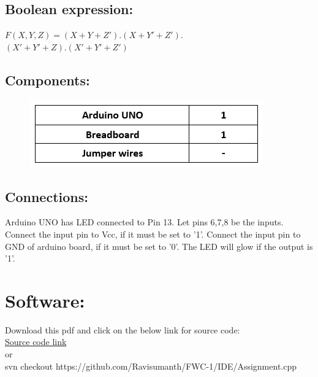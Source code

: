 \documentclass[a4paper,12pt,twocolumn]{article}
\begin{document}
\subsection{Boolean expression:}
$F(X,Y,Z)=(X+Y+Z').(X+Y'+Z').$\\$(X'+Y'+Z).(X'+Y'+Z')$

\newpage
\subsection{Components:} 
\begin{figure}[h]
\centering
\includegraphics[width=1\columnwidth]{TT-2-document}
\label{Truth Table}
\end{figure}
\subsection{Connections:}
Arduino UNO has LED connected to Pin 13. Let pins 6,7,8 be the inputs. Connect the input pin to Vcc, if it must be set to '1'. Connect the input pin to GND of arduino board, if it must be set to '0'. The LED will glow if the output is '1'. 
\section{Software:}
Download this pdf and click on the below link for source code:\\
\href{https://raw.githubusercontent.com/Ravisumanth/FWC-1/main/IDE/Assignment.cpp}{Source code link}\\or\\
svn checkout https://github.com/Ravisumanth/FWC-1/IDE/Assignment.cpp
\end{document}
